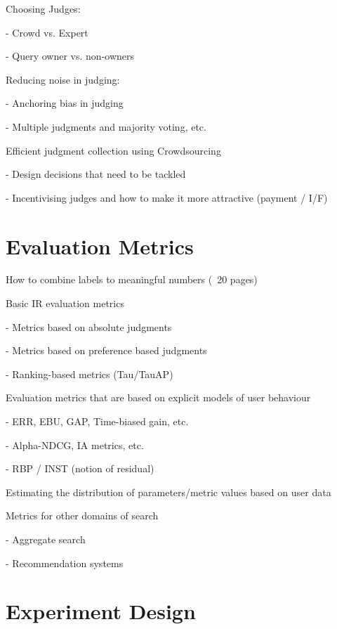 \documentclass[openany]{now} %
\newcommand{\newpar}{\bigskip\noindent}
\begin{document}
Choosing Judges: 

- Crowd vs. Expert \cite{Kazai:2013} \cite{Alonso20121053}

- Query owner vs. non-owners \cite{Chouldechova:2013}

\newpar
Reducing noise in judging: 

- Anchoring bias in judging \cite{Shokouhi:2015}

- Multiple judgments and majority voting, etc. \cite{Venanzi:2014}

\newpar
Efficient judgment collection using Crowdsourcing

-	Design decisions that need to be tackled  \cite{Blanco:2011} \cite{Kazai2012} \cite{Alonso2012} \cite{Alonso:2015} \cite{Scholer:2013} 

-	Incentivising judges and how to make it more attractive (payment / I/F)
\cite{Megorskaya2015} \cite{Davtyan2015}  \cite{Rokicki:2014}  \cite{Eickhoff:2012}

\chapter{Evaluation Metrics}
\label{c-metrics}

How to combine labels to meaningful numbers (~20 pages)

\newpar
Basic IR evaluation metrics

- Metrics based on absolute judgments

- Metrics based on preference based judgments 

- Ranking-based metrics (Tau/TauAP)

\newpar
Evaluation metrics that are based on explicit models of user behaviour

-	ERR, EBU, GAP, Time-biased gain, etc.

-	Alpha-NDCG, IA metrics, etc.

-	RBP / INST (notion of residual) \cite{Moffat2013}

\newpar
Estimating the distribution of parameters/metric values based on user data

\cite{CarteretteKY11}

\newpar
Metrics for other domains of search

- Aggregate search \cite{Zhou:2013}

- Recommendation systems \cite{gunawardana2015evaluating}

\chapter{Experiment Design}
\label{c-experiment-design}
\end{document}
